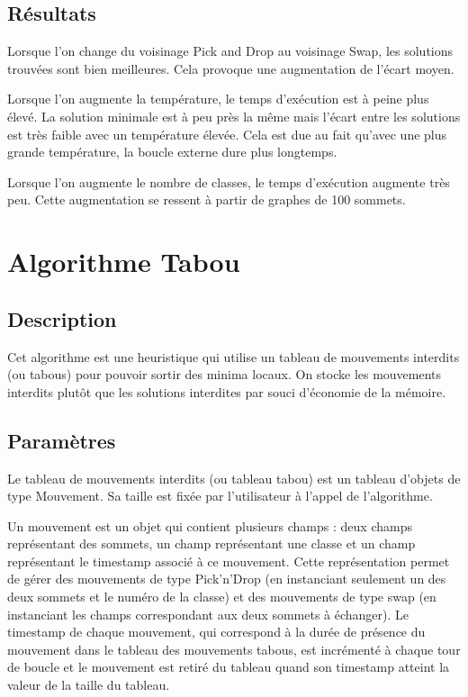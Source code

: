 \documentclass[12pt]{article}
\begin{document}
\subsection{Résultats}

Lorsque l’on change du voisinage Pick and Drop au voisinage Swap, les solutions trouvées sont bien meilleures. Cela provoque une augmentation de l'écart moyen.

Lorsque l’on augmente la température, le temps d’exécution est à peine plus élevé. La solution minimale est à peu près la même mais l’écart entre les solutions est très faible avec un température élevée. Cela est due au fait qu’avec une plus grande température, la boucle externe dure plus longtemps.

Lorsque l’on augmente le nombre de classes, le temps d'exécution augmente très peu. Cette augmentation se ressent à partir de graphes de 100 sommets.

\newpage

\section{Algorithme Tabou}
\subsection{Description}
Cet algorithme est une heuristique qui utilise un tableau de mouvements interdits (ou tabous) pour pouvoir sortir des minima locaux. On stocke les mouvements interdits plutôt que les solutions interdites par souci d’économie de la mémoire.

\subsection{Paramètres}
Le tableau de mouvements interdits (ou tableau tabou) est un tableau d’objets de type Mouvement. Sa taille est fixée par l’utilisateur à l’appel de l’algorithme.

Un mouvement est un objet qui contient plusieurs champs : deux champs représentant des sommets, un champ représentant une classe et un champ représentant le timestamp associé à ce mouvement. Cette représentation permet de gérer des mouvements de type Pick’n’Drop (en instanciant seulement un des deux sommets et le numéro de la classe) et des mouvements de type swap (en instanciant les champs correspondant aux deux sommets à échanger).
Le timestamp de chaque mouvement, qui correspond à la durée de présence du mouvement dans le tableau des mouvements tabous, est incrémenté à chaque tour de boucle et le mouvement est retiré du tableau quand son timestamp atteint la valeur de la taille du tableau.
\end{document}

